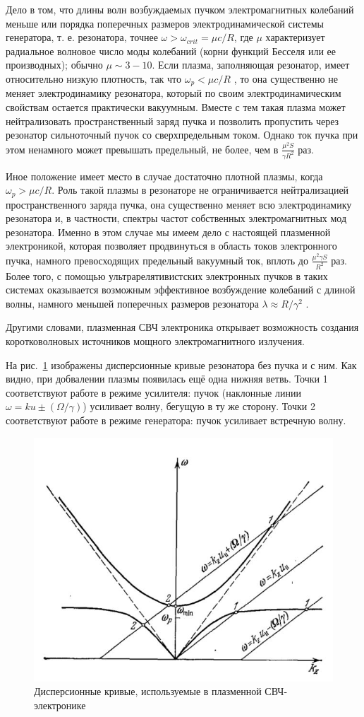 \documentclass[10pt, a4paper]{article}
\begin{document}
Дело в том, что длины волн возбуждаемых пучком электромагнитных колебаний меньше или порядка поперечных размеров электродинамической системы генератора, т. е. резонатора, точнее $\omega>\omega_{crit} = \mu c/R$, где $\mu$ характеризует радиальное волновое число моды колебаний (корни функций Бесселя или ее производных); обычно $\mu \sim 3-10$. Если плазма, заполняющая резонатор, имеет относительно низкую плотность, так что $\omega_p<\mu c/R$ , то она существенно не меняет электродинамику резонатора, который по своим электродинамическим свойствам остается практически вакуумным. Вместе с тем такая плазма может нейтрализовать пространственный заряд пучка и позволить пропустить через резонатор сильноточный пучок со сверхпредельным током. Однако ток пучка при этом ненамного может превышать предельный, не более, чем в $\frac{\mu^2S}{\gamma R^2}$ раз.

Иное положение имеет место в случае достаточно плотной плазмы, когда $\omega_p>\mu c/R$. Роль такой плазмы в резонаторе не ограничивается нейтрализацией пространственного заряда пучка, она существенно меняет всю электродинамику резонатора и, в частности, спектры частот собственных электромагнитных мод резонатора. Именно в этом случае мы имеем дело с настоящей плазменной электроникой, которая позволяет продвинуться в область токов электронного пучка, намного превосходящих предельный вакуумный ток, вплоть до $\frac{\mu^2\gamma S}{R^2}$ раз. Более того, с помощью ультрарелятивистских электронных пучков в таких системах оказывается возможным эффективное возбуждение колебаний с длиной волны, намного меньшей поперечных размеров резонатора $\lambda \approx R/\gamma^2$ .

Другими словами, плазменная СВЧ электроника открывает возможность создания коротковолновых источников мощного электромагнитного излучения.

На рис.~\ref{fig:microwave_plasma_electronics} изображены дисперсионные кривые резонатора без пучка и с ним. Как видно, при добвалении плазмы появилась ещё одна нижняя ветвь. Точки 1 соответствуют работе в режиме усилителя: пучок (наклонные линии $\omega=ku\pm(\Omega/\gamma)$) усиливает волну, бегущую в ту же сторону. Точки 2 соответствуют работе в режиме генератора: пучок усиливает встречную волну.

\begin{figure}[ht]
	\begin{center}
		\includegraphics[width = 0.5\linewidth]{dispers_14_3.JPG}
	\end{center}
	\caption{Дисперсионные кривые, используемые в плазменной СВЧ-электронике}
	\label{fig:microwave_plasma_electronics}
\end{figure}
\end{document}
